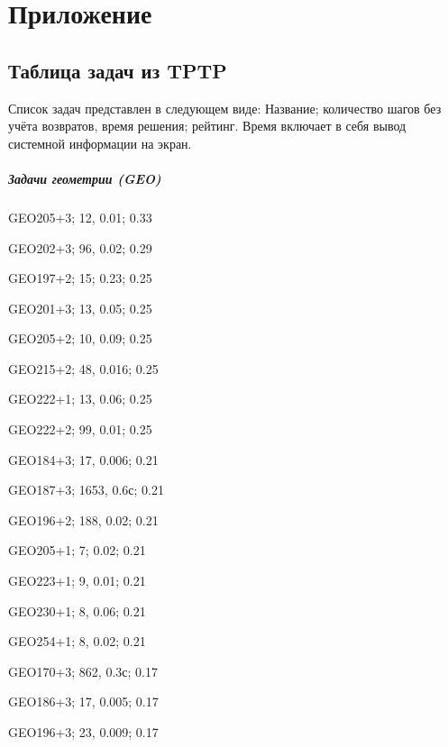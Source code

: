 \chapter*{Приложение}




\section*{Таблица задач из TPTP}
Список задач представлен в следующем виде: Название; количество шагов без учёта возвратов, время решения; рейтинг. Время включает в себя вывод системной информации на экран.

\paragraph{Задачи геометрии (GEO)}

GEO205+3; 12, 0.01; 0.33

GEO202+3; 96, 0.02; 0.29







GEO197+2; 15; 0.23; 0.25

GEO201+3; 13, 0.05; 0.25

GEO205+2; 10, 0.09; 0.25

GEO215+2; 48, 0.016; 0.25

GEO222+1; 13, 0.06; 0.25

GEO222+2; 99, 0.01; 0.25


GEO184+3; 17, 0.006; 0.21

GEO187+3; 1653, 0.6с; 0.21

GEO196+2; 188, 0.02; 0.21

GEO205+1; 7; 0.02; 0.21

GEO223+1; 9, 0.01; 0.21

GEO230+1; 8, 0.06; 0.21

GEO254+1; 8, 0.02; 0.21


GEO170+3; 862, 0.3с; 0.17

GEO186+3; 17, 0.005; 0.17

GEO196+3; 23, 0.009; 0.17

